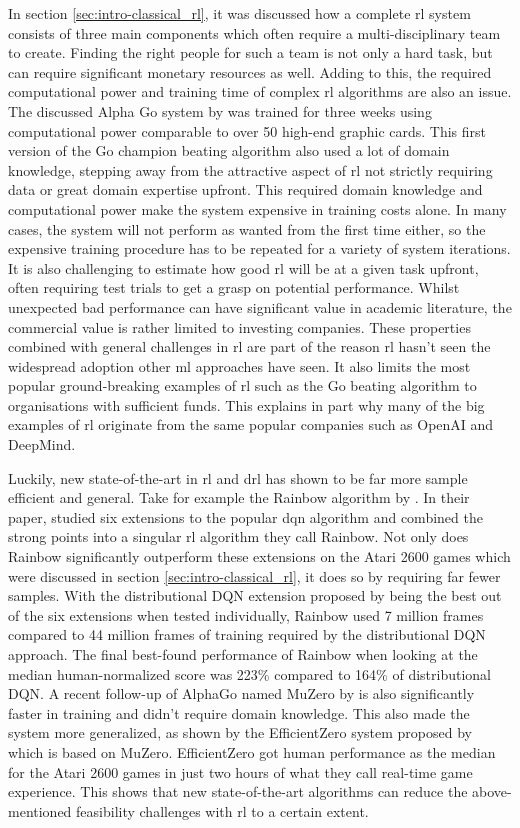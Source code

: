 In section \ref{sec:intro-classical_rl}, it was discussed how a complete \gls{rl} system consists of three main components which often require a multi-disciplinary team to create.
Finding the right people for such a team is not only a hard task, but can require significant monetary resources as well.
Adding to this, the required computational power and training time of complex \gls{rl} algorithms are also an issue.
The discussed Alpha Go system by \citet{alphago} was trained for three weeks using computational power comparable to over 50 high-end graphic cards.
This first version of the Go champion beating algorithm also used a lot of domain knowledge, stepping away from the attractive aspect of \gls{rl} not strictly requiring data or great domain expertise upfront.
This required domain knowledge and computational power make the system expensive in training costs alone.
In many cases, the system will not perform as wanted from the first time either, so the expensive training procedure has to be repeated for a variety of system iterations.
It is also challenging to estimate how good \gls{rl} will be at a given task upfront, often requiring test trials to get a grasp on potential performance.
Whilst unexpected bad performance can have significant value in academic literature, the commercial value is rather limited to investing companies.
These properties combined with general challenges in \gls{rl} are part of the reason \gls{rl} hasn't seen the widespread adoption other \gls{ml} approaches have seen.
It also limits the most popular ground-breaking examples of \gls{rl} such as the Go beating algorithm to organisations with sufficient funds.
This explains in part why many of the big examples of \gls{rl} originate from the same popular companies such as OpenAI and DeepMind.

Luckily, new state-of-the-art in \gls{rl} and \gls{drl} has shown to be far more sample efficient and general.
Take for example the Rainbow algorithm by \citet{rainbow}.
In their paper, \citet{rainbow} studied six extensions to the popular \gls{dqn} algorithm and combined the strong points into a singular \gls{rl} algorithm they call Rainbow.
Not only does Rainbow significantly outperform these extensions on the Atari 2600 games which were discussed in section \ref{sec:intro-classical_rl}, it does so by requiring far fewer samples.
With the distributional DQN extension proposed by \citet{distributional_dqn} being the best out of the six extensions when tested individually, Rainbow used 7 million frames compared to 44 million frames of training required by the distributional DQN approach.
The final best-found performance of Rainbow when looking at the median human-normalized score was 223\% compared to 164\% of distributional DQN.
A recent follow-up of AlphaGo named MuZero by \citet{muzero} is also significantly faster in training and didn't require domain knowledge.
This also made the system more generalized, as shown by the EfficientZero system proposed by \citet{efficient_zero} which is based on MuZero. EfficientZero got human performance as the median for the Atari 2600 games in just two hours of what they call real-time game experience.
This shows that new state-of-the-art algorithms can reduce the above-mentioned feasibility challenges with \gls{rl} to a certain extent.

